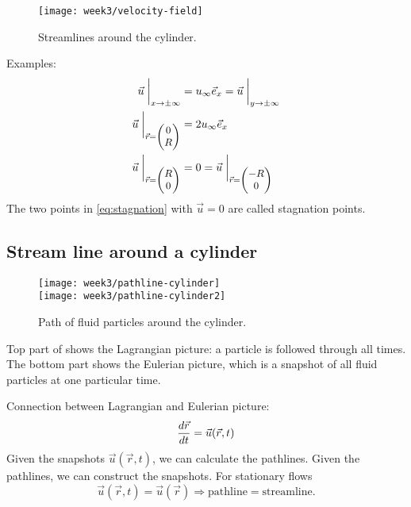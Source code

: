 \begin{figure}[!h]
    \centering
    \texttt{[image: week3/velocity-field]}
    \caption{Streamlines around the cylinder.}
    \label{fig:velocity-field2}
\end{figure}

Examples:
\begin{align}
\vec{u}\biggm\vert_{x\rightarrow\pm\infty} &= u_\infty\vec{e}_x = \vec{u}\biggm\vert_{y\rightarrow\pm\infty}\\
\vec{u}\biggm\vert_{\small\vec{r}=\begin{pmatrix} 0 \\ R
\end{pmatrix}} &= 2u_\infty\vec{e}_x \\
\vec{u}\biggm\vert_{\small\vec{r}=\begin{pmatrix} R \\ 0
\end{pmatrix}} &= 0 = \vec{u}\biggm\vert_{\small\vec{r}=\begin{pmatrix} -R \\ 0
\end{pmatrix}}\label{eq:stagnation}
\end{align}
The two points in \eqref{eq:stagnation} with $\vec{u}=0$ are called stagnation points.

\subsection{Stream line around a cylinder}
\begin{figure}[!h]
    \centering
    \texttt{[image: week3/pathline-cylinder]}\\
    \texttt{[image: week3/pathline-cylinder2]}
    \caption{Path of fluid particles around the cylinder.}
    \label{fig:pathline-cylinder}
\end{figure}
Top part of  shows the Lagrangian picture: a particle is followed through all times. The bottom part shows the Eulerian picture, which is a snapshot of all fluid particles at one particular time.

Connection between Lagrangian and Eulerian picture:
\begin{equation}
\frac{d \vec{r}}{d t} = \vec{u}(\vec{r},t)
\end{equation}
Given the snapshots $\vec{u}(\vec{r},t)$, we can calculate the pathlines. Given the pathlines, we can construct the snapshots. For stationary flows
\begin{equation}
\vec{u}(\vec{r},t)=\vec{u}(\vec{r}) \Rightarrow \mathrm{pathline} = \mathrm{streamline}.
\end{equation}

